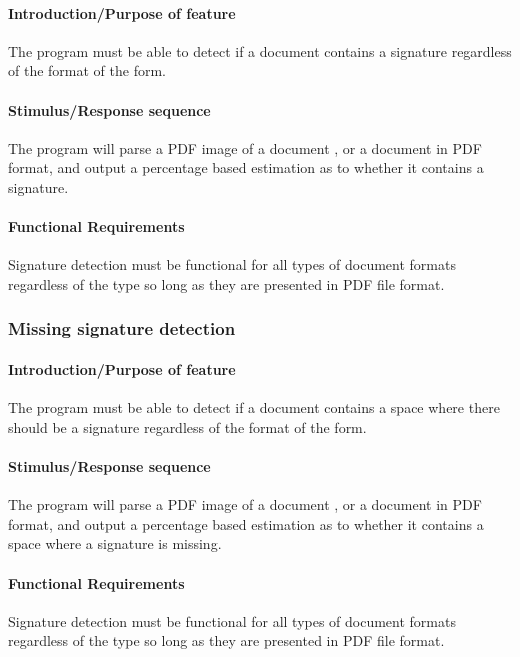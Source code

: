 \documentclass[onecolumn, draftclsnofoot,10pt, compsoc]{IEEEtran}
\begin{document}
\hfill\begin{minipage}{\dimexpr\textwidth-1cm}
\paragraph{Introduction/Purpose of feature}
The program must be able to detect if a document contains a signature regardless of the format of the form.
\paragraph{Stimulus/Response sequence}
The program will parse a PDF image of a document , or a document in PDF format, and output a percentage based estimation as to whether it contains a signature.
\paragraph{Functional Requirements}
Signature detection must be functional for all types of document formats regardless of the type so long as they are presented in PDF file format. 
\end{minipage}
\vspace{.75cm}


\subsubsection{Missing signature detection}\vspace{.5cm}

\hfill\begin{minipage}{\dimexpr\textwidth-1cm}
\paragraph{Introduction/Purpose of feature}
The program must be able to detect if a document contains a space where there should be a signature regardless of the format of the form.
\paragraph{Stimulus/Response sequence}
The program will parse a PDF image of a document , or a document in PDF format, and output a percentage based estimation as to whether it contains a space where a signature is missing.
\paragraph{Functional Requirements}
Signature detection must be functional for all types of document formats regardless of the type so long as they are presented in PDF file format. 
\end{minipage}
\vspace{.75cm}
\end{document}
